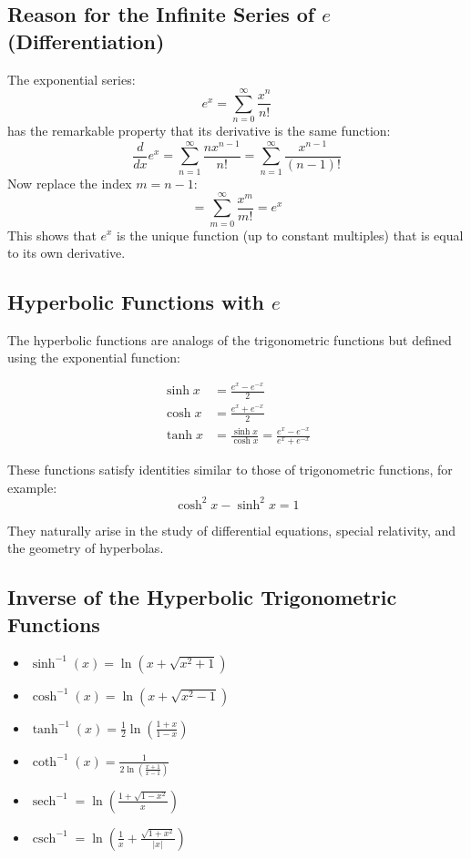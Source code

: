 \subsection{Reason for the Infinite Series of \texorpdfstring{\(e\)}{e} (Differentiation)}

The exponential series:
\[
e^x = \sum_{n=0}^{\infty} \frac{x^n}{n!}
\]
has the remarkable property that its derivative is the same function:
\[
\frac{d}{dx} e^x = \sum_{n=1}^{\infty} \frac{n x^{n-1}}{n!} = \sum_{n=1}^{\infty} \frac{x^{n-1}}{(n-1)!}
\]
Now replace the index \(m = n - 1\):
\[
= \sum_{m=0}^{\infty} \frac{x^m}{m!} = e^x
\]
This shows that \(e^x\) is the unique function (up to constant multiples) that is equal to its own derivative.

\subsection{Hyperbolic Functions with \texorpdfstring{\(e\)}{e}}

The hyperbolic functions are analogs of the trigonometric functions but defined using the exponential function:

\begin{align*}
\sinh x &= \frac{e^x - e^{-x}}{2} \\
\cosh x &= \frac{e^x + e^{-x}}{2} \\
\tanh x &= \frac{\sinh x}{\cosh x} = \frac{e^x - e^{-x}}{e^x + e^{-x}}
\end{align*}

These functions satisfy identities similar to those of trigonometric functions, for example:
\[
\cosh^2 x - \sinh^2 x = 1
\]

They naturally arise in the study of differential equations, special relativity, and the geometry of hyperbolas.

\subsection{Inverse of the Hyperbolic Trigonometric Functions}

\begin{itemize}[label=\(-\)]
    \item \(\sinh^{-1}(x) = \ln(x + \sqrt{x^2 + 1})\)
    \item \(\cosh^{-1}(x) = \ln(x + \sqrt{x^2 - 1})\)
    \item \(\tanh^{-1}(x) = \frac{1}{2} \ln\left(\frac{1 + x}{1 - x}\right)\)
    \item \(\coth^{-1}(x) = \frac{1}{2 \ln\left(\frac{x + 1}{x - 1}\right)}\)
    \item \(\operatorname{sech}^{-1} = \ln\left(\frac{1 + \sqrt{1 - x^2}}{x}\right)\)
    \item \(\operatorname{csch}^{-1} = \ln\left( \frac{1}{x} + \frac{\sqrt{1 + x^2}}{|x|}\right)\) 
\end{itemize}